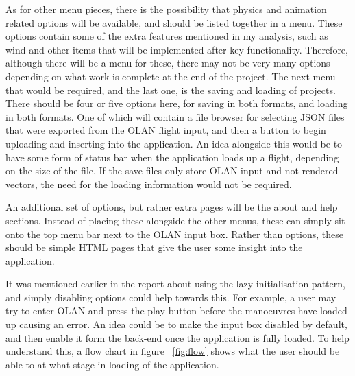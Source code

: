 As for other menu pieces, there is the possibility that physics and animation related options will be available, and should be listed together in a menu. These options contain some of the extra features mentioned in my analysis, such as wind and other items that will be implemented after key functionality. Therefore, although there will be a menu for these, there may not be very many options depending on what work is complete at the end of the project. The next menu that would be required, and the last one, is the saving and loading of projects. There should be four or five options here, for saving in both formats, and loading in both formats. One of which will contain a file browser for selecting JSON files that were exported from the OLAN flight input, and then a button to begin uploading and inserting into the application. An idea alongside this would be to have some form of status bar when the application loads up a flight, depending on the size of the file. If the save files only store OLAN input and not rendered vectors, the need for the loading information would not be required.

An additional set of options, but rather extra pages will be the about and help sections. Instead of placing these alongside the other menus, these can simply sit onto the top menu bar next to the OLAN input box. Rather than options, these should be simple HTML pages that give the user some insight into the application.

It was mentioned earlier in the report about using the lazy initialisation pattern, and simply disabling options could help towards this. For example, a user may try to enter OLAN and press the play button before the manoeuvres have loaded up causing an error. An idea could be to make the input box disabled by default, and then enable it form the back-end once the application is fully loaded. To help understand this, a flow chart in figure ~\ref{fig:flow} shows what the user should be able to at what stage in loading of the application. 

\clearpage

